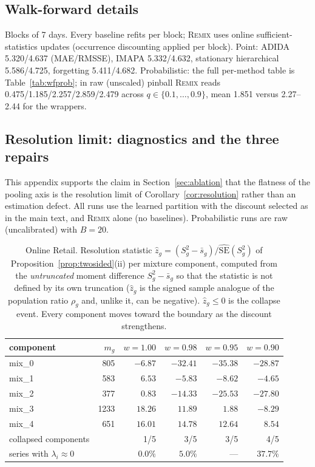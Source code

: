 \documentclass[twocolumn,10pt]{article}
\newcommand{\REMIX}{\textsc{Remix}}
\begin{document}
\subsection{Walk-forward details}
Blocks of 7 days. Every baseline refits per block; \REMIX{} uses online
sufficient-statistics updates (occurrence discounting applied per block).
Point: ADIDA 5.320/4.637 (MAE/RMSSE), IMAPA 5.332/4.632, stationary
hierarchical 5.586/4.725, forgetting 5.411/4.682. Probabilistic: the
full per-method table is Table~\ref{tab:wfprob}; in raw (unscaled)
pinball \REMIX{} reads 0.475/1.185/2.257/2.859/2.479 across
$q\in\{0.1,\dots,0.9\}$, mean 1.851 versus 2.27--2.44 for the
wrappers.

\subsection{Resolution limit: diagnostics and the three repairs}
\label{app:resolution}

This appendix supports the claim in Section~\ref{sec:ablation} that the
flatness of the pooling axis is the resolution limit of
Corollary~\ref{cor:resolution} rather than an estimation defect. All
runs use the learned partition with the discount selected as in the main
text, and \REMIX{} alone (no baselines). Probabilistic runs are raw
(uncalibrated) with $B=20$.

\begin{table}[t]
\centering
\caption{Online Retail. Resolution statistic
$\hat z_g=(S_g^2-\bar s_g)/\widehat{\mathrm{SE}}(S_g^2)$ of
Proposition~\ref{prop:twosided}(ii) per mixture component, computed from
the \emph{untruncated} moment difference $S_g^2-\bar s_g$ so that the
statistic is not defined by its own truncation ($\hat z_g$ is the signed
sample analogue of the population ratio $\rho_g$ and, unlike it, can be
negative). $\hat z_g\le0$ is the collapse event. Every component moves
toward the boundary as the discount strengthens.}
\label{tab:identifiability}
\begin{tabular}{lrrrrr}
\toprule
component & $m_g$ & $w{=}1.00$ & $w{=}0.98$ & $w{=}0.95$ & $w{=}0.90$\\
\midrule
mix\_0 & 805 & $-6.87$ & $-32.41$ & $-35.38$ & $-28.87$\\
mix\_1 & 583 & $6.53$ & $-5.83$ & $-8.62$ & $-4.65$\\
mix\_2 & 377 & $0.83$ & $-14.33$ & $-25.53$ & $-27.80$\\
mix\_3 & 1233 & $18.26$ & $11.89$ & $1.88$ & $-8.29$\\
mix\_4 & 651 & $16.01$ & $14.78$ & $12.64$ & $8.54$\\
\midrule
collapsed components & & 1/5 & 3/5 & 3/5 & 4/5\\
series with $\lambda_i\!\approx\!0$ & & $0.0\%$ & $5.0\%$ & --- & $37.7\%$\\
\bottomrule
\end{tabular}
\end{table}
\end{document}
